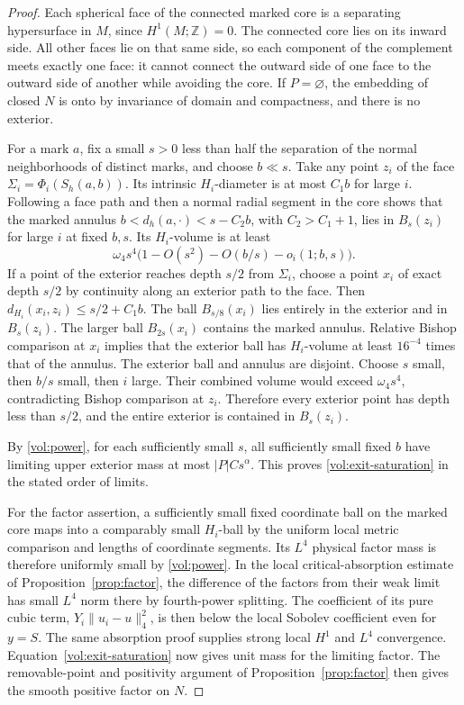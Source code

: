 \begin{proof}
Each spherical face of the connected marked core is a separating
hypersurface in \(M\), since \(H^1(M;\mathbb Z)=0\). The connected
core lies on its inward side. All other faces lie on that same
side, so each component of the complement meets exactly one face:
it cannot connect the outward side of one face to the outward
side of another while avoiding the core. If \(P=\varnothing\),
the embedding of closed \(N\) is onto by invariance of domain
and compactness, and there is no exterior.

For a mark \(a\), fix a small \(s>0\) less than half the separation
of the normal neighborhoods of distinct marks, and choose
\(b\ll s\). Take any point \(z_i\) of the face
\(\Sigma_i=\Phi_i(S_h(a,b))\). Its intrinsic \(H_i\)-diameter
is at most \(C_1 b\) for large \(i\). Following a face path and
then a normal radial segment in the core shows that the marked
annulus \(b<d_h(a,\cdot)<s-C_2 b\), with \(C_2>C_1+1\), lies
in \(B_s(z_i)\) for large \(i\) at fixed \(b,s\).
Its \(H_i\)-volume is at least
\[
 \omega_4s^4\bigl(1-O(s^2)-O(b/s)-o_i(1;b,s)\bigr).
\]
If a point of the exterior reaches depth \(s/2\) from \(\Sigma_i\),
choose a point \(x_i\) of exact depth \(s/2\) by continuity
along an exterior path to the face. Then
\(d_{H_i}(x_i,z_i)\leq s/2+C_1 b\). The ball \(B_{s/8}(x_i)\)
lies entirely in the exterior and in \(B_s(z_i)\).
The larger ball \(B_{2s}(x_i)\) contains the marked annulus.
Relative Bishop comparison at \(x_i\) implies that the exterior
ball has \(H_i\)-volume at least \(16^{-4}\) times that of
the annulus. The exterior ball and annulus are disjoint.
Choose \(s\) small, then \(b/s\) small, then \(i\) large.
Their combined volume would exceed \(\omega_4 s^4\), contradicting
Bishop comparison at \(z_i\). Therefore every exterior point
has depth less than \(s/2\), and the entire exterior is contained
in \(B_s(z_i)\).

By \eqref{vol:power}, for each sufficiently small \(s\), all
sufficiently small fixed \(b\) have limiting upper exterior mass at
most \(|P|Cs^\alpha\). This proves \eqref{vol:exit-saturation}
in the stated order of limits.

For the factor assertion, a sufficiently small fixed coordinate
ball on the marked core maps into a comparably small \(H_i\)-ball
by the uniform local metric comparison and lengths of coordinate
segments. Its \(L^4\) physical factor mass is therefore uniformly
small by \eqref{vol:power}. In the local critical-absorption estimate
of Proposition~\ref{prop:factor}, the difference of the factors
from their weak limit has small \(L^4\) norm there by fourth-power
splitting. The coefficient of its pure cubic term,
\(Y_i\|u_i-u\|_4^2\), is then below the local Sobolev coefficient
even for \(y=S\). The same absorption proof supplies strong local
\(H^1\) and \(L^4\) convergence. Equation~\eqref{vol:exit-saturation}
now gives unit mass for the limiting factor. The removable-point
and positivity argument of Proposition~\ref{prop:factor} then
gives the smooth positive factor on \(N\).
\end{proof}
